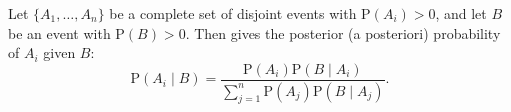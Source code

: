 Let $\{A_1, \ldots, A_n\}$ be a complete set of disjoint events with $\text{P}(A_i) > 0$, and let $B$ be an event with $\text{P}(B) > 0$. Then  gives the posterior (a posteriori) probability of $A_i$ given $B$:
$$\text{P}(A_i \mid B) = \frac{\text{P}(A_i) \text{P}(B \mid A_i)}{\sum_{j=1}^{n} \text{P}(A_j) \text{P}(B \mid A_j)}.$$
